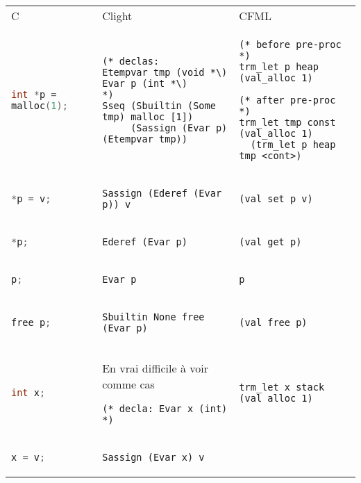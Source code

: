 \documentclass[class=scrartcl,border={0cm 1.5cm 1cm -0.5cm},multi={tabular}]{standalone}
\theoremstyle{break}
\newcommand{\clst}[1]{\lstinline[language=C]!#1!}
\begin{document}
\begin{tabular}{p{6cm}p{10cm}p{10cm}}
  \toprule
  C & Clight & CFML \\
  \clst{int *p = malloc(1);} &
\begin{lstlisting}
(* declas:
Etempvar tmp (void *\)
Evar p (int *\)
*)
Sseq (Sbuiltin (Some tmp) malloc [1])
     (Sassign (Evar p) (Etempvar tmp))
\end{lstlisting} &
\begin{lstlisting}
(* before pre-proc *)
trm_let p heap (val_alloc 1)

(* after pre-proc *)
trm_let tmp const (val_alloc 1)
  (trm_let p heap tmp <cont>)
\end{lstlisting} \\
  \clst{*p = v;}  &
\begin{lstlisting}
Sassign (Ederef (Evar p)) v
\end{lstlisting} &
\begin{lstlisting}
(val_set p v)
\end{lstlisting} \\
  \clst{*p;} &
\begin{lstlisting}
Ederef (Evar p)
\end{lstlisting} &
\begin{lstlisting}
(val_get p)
\end{lstlisting} \\
\clst{p;} &
\begin{lstlisting}
Evar p
\end{lstlisting} &
\begin{lstlisting}
p
\end{lstlisting} \\
  \clst{free p;} &
\begin{lstlisting}
Sbuiltin None free (Evar p)
\end{lstlisting} &
\begin{lstlisting}
(val_free p)
\end{lstlisting} \\
  \midrule
  \clst{int x;} &
En vrai difficile à voir comme cas
\begin{lstlisting}
(* decla: Evar x (int) *)
\end{lstlisting} &
\begin{lstlisting}
trm_let x stack (val_alloc 1)
\end{lstlisting} \\
  \clst{x = v;} &
\begin{lstlisting}
Sassign (Evar x) v
\end{lstlisting} &

\end{tabular}
\end{document}
